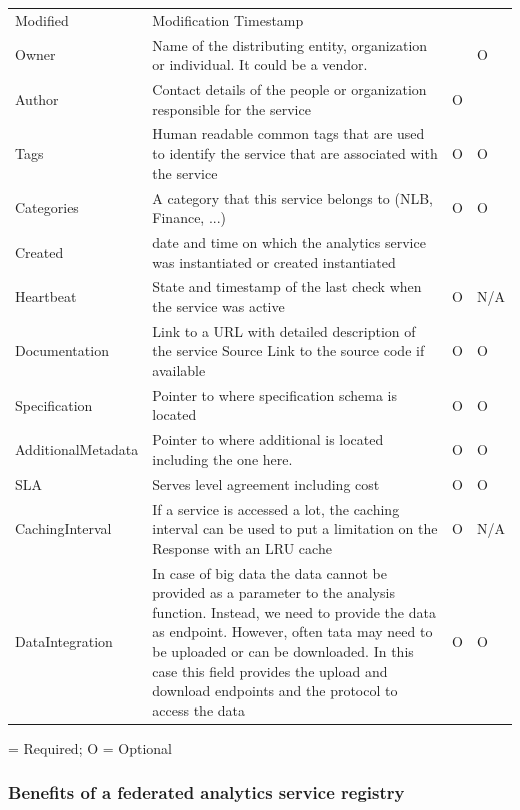 \documentclass[12pt]{article}
\begin{document}
\begin{table}[H]
{\begin{tabular}{p{3cm}p{11cm}p{0.5cm}p{0.5cm}}
Modified & 	Modification Timestamp	& \OK& \OK \\
Owner	& Name of the distributing entity, organization or individual. It could be a vendor.	& \OK	& O \\
Author &	Contact details of the people or organization responsible for the service	& O	& \OK \\
Tags &	Human readable common tags that are used to identify the service that are associated with the service	& O & O \\
Categories &	A category that this service belongs to (NLB, Finance, ...)	& O & O \\
Created	& date and time on which the analytics service was instantiated or created	instantiated	& \OK & \OK \\
Heartbeat &	State and timestamp of the last check when the service was active	& O & 	N/A \\
Documentation &	Link to a URL with detailed description of the service
Source	Link to the source code if available	& O & O \\
Specification &	Pointer to where specification schema is located	& O &  O \\
AdditionalMetadata	& Pointer to where additional is located including the one here.	& O &	O \\
SLA	& Serves level agreement including cost	& O 	& O \\
CachingInterval	&If a service is accessed a lot, the caching interval can be used to put a limitation on the Response with an LRU cache	& O &	N/A \\
DataIntegration &	In case of big data the data cannot be provided as a parameter to the analysis function. Instead, we need to provide the data as endpoint. However, often tata may need to be uploaded or can be downloaded. In this case this field provides the upload and download endpoints and the protocol to access the data	& O &	O \\
\hline
\end{tabular}
}
\OK = Required; O = Optional
\end{table}

\subsubsection{Benefits of a federated analytics service registry}
\end{document}
